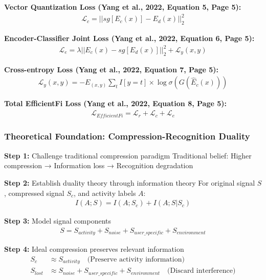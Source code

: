 \documentclass[12pt,a4paper]{article}
\begin{document}
\textbf{Vector Quantization Loss (Yang et al., 2022, Equation 5, Page 5):}
\begin{align}
\mathcal{L}_c = ||sg[E_c(x)] - E_d(x)||_2^2 \label{eq:efficientfi_vq}
\end{align}

\textbf{Encoder-Classifier Joint Loss (Yang et al., 2022, Equation 6, Page 5):}
\begin{align}
\mathcal{L}_e = \lambda||E_c(x) - sg[E_d(x)]||_2^2 + \mathcal{L}_y(x, y) \label{eq:efficientfi_joint}
\end{align}

\textbf{Cross-entropy Loss (Yang et al., 2022, Equation 7, Page 5):}
\begin{align}
\mathcal{L}_y(x, y) = -E_{(x,y)} \sum_t I[y = t] \times \log \sigma(G(\hat{E}_c(x))) \label{eq:efficientfi_crossentropy}
\end{align}

\textbf{Total EfficientFi Loss (Yang et al., 2022, Equation 8, Page 5):}
\begin{align}
\mathcal{L}_{EfficientFi} = \mathcal{L}_r + \mathcal{L}_c + \mathcal{L}_e \label{eq:efficientfi_total}
\end{align}

\subsubsection{Theoretical Foundation: Compression-Recognition Duality}

\textbf{Step 1:} Challenge traditional compression paradigm
Traditional belief: Higher compression → Information loss → Recognition degradation

\textbf{Step 2:} Establish duality theory through information theory
For original signal $S$, compressed signal $S_c$, and activity labels $A$:
\begin{align}
I(A;S) = I(A;S_c) + I(A;S|S_c) \label{eq:information_decomposition}
\end{align}

\textbf{Step 3:} Model signal components
\begin{align}
S = S_{activity} + S_{noise} + S_{user\_specific} + S_{environment} \label{eq:signal_decomposition}
\end{align}

\textbf{Step 4:} Ideal compression preserves relevant information
\begin{align}
S_c &\approx S_{activity} \quad \text{(Preserve activity information)} \label{eq:ideal_compression_keep}\\
S_{lost} &\approx S_{noise} + S_{user\_specific} + S_{environment} \quad \text{(Discard interference)} \label{eq:ideal_compression_discard}
\end{align}
\end{document}
